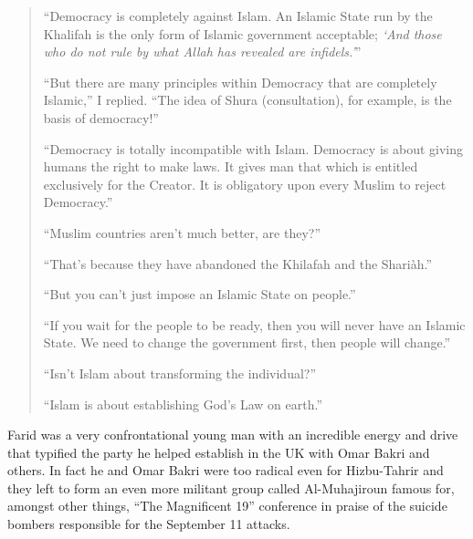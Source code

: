 \documentclass[12pt]{memoir}
\begin{document}
\begin{quote}
“Democracy is completely against Islam.
An Islamic State run by the Khalifah
is the only form of Islamic government acceptable;
\emph{‘And those who do not rule by what Allah has revealed are infidels.’}”

“But there are many principles within Democracy
that are completely Islamic,” I replied.
“The idea of Shura (consultation), for example, is the basis of democracy!”

“Democracy is totally incompatible with Islam.
Democracy is about giving humans the right to make laws.
It gives man that which is entitled exclusively for the Creator.
It is obligatory upon every Muslim to reject Democracy.”

“Muslim countries aren’t much better, are they?”

“That’s because they have abandoned the Khilafah and the Shari\`ah.”

“But you can’t just impose an Islamic State on people.”

“If you wait for the people to be ready,
then you will never have an Islamic State.
We need to change the government first, then people will change.”

“Isn’t Islam about transforming the individual?”

“Islam is about establishing God’s Law on earth.”
\end{quote}

Farid was a very confrontational young man with an incredible energy
and drive that typified the party he helped establish
in the UK with Omar Bakri and others.
In fact he and Omar Bakri were too radical even for Hizbu-Tahrir
and they left to form an even more militant group
called Al-Muhajiroun famous for, amongst other things,
“The Magnificent 19” conference in praise of the suicide bombers
responsible for the September 11 attacks.
\end{document}
